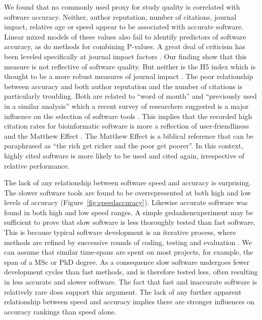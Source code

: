\documentclass[fleqn,10pt]{SelfArx} %
\begin{document}
We found that no commonly used proxy for study quality is correlated with software accuracy. Neither, author reputation, number of citations, journal impact, relative age or speed appear to be associated with accurate software. Linear mixed models of these values also fail to identify predictors of software accuracy, as do methods for combining P-values. A great deal of criticism has been leveled specifically at journal impact factors \cite{Editors2006-ue,Rossner2007-yk,Lariviere2010-kx}. Our finding show that this measure is not reflective of software quality. But neither is the H5 index which is thought to be a more robust measures of journal impact \cite{Harzing2008-wb}. The poor relationship between accuracy and both author reputation and the number of citations is particularly troubling. Both are related to “word of mouth” and “previously used in a similar analysis” which a recent survey of researchers suggested is a major influence on the selection of software tools \cite{Loman2015-bw}. This implies that the recorded high citation rates for bioinformatic software  \cite{Perez-Iratxeta2007-lv,Van_Noorden2014-kc,Wren2016-xy} is more a reflection of user-friendliness and the Matthew Effect \cite{Lariviere2010-kx,Merton1968-cb}. The Matthew Effect is a biblical reference that can be paraphrased as “the rich get richer and the poor get poorer”. In this context, highly cited software is more likely to be used and cited again, irrespective of relative performance. 

The lack of any relationship between software speed and accuracy is surprising. 
The slower software tools are found to be overrepresented at both high and low levels of accuracy (Figure~\ref{fig:speedaccuracy}). Likewise accurate software was found in both high and low speed ranges. A simple gedankenexperiment may be sufficient to prove that slow software is less thoroughly tested than fast software. This is because typical software development is an iterative process, where methods are refined by successive rounds of coding, testing and evaluation \cite{Wilson2006-ih}. We can assume that similar time-spans are spent on most projects, for example, the span of a MSc or PhD degree.  As a consequence slow software undergoes fewer development cycles than fast methods, and is therefore tested less, often resulting in less accurate and slower software. The fact that fast and inaccurate software is relatively rare does support this argument. The lack of any further apparent relationship between speed and accuracy implies there are stronger influences on accuracy rankings than speed alone.
\end{document}

